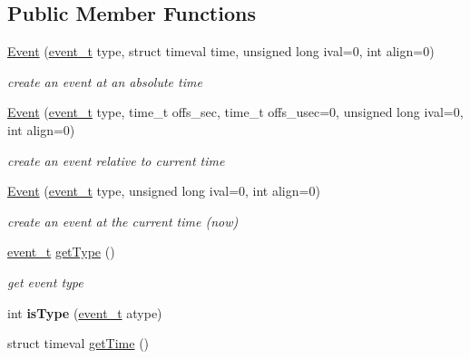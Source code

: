 \subsection*{Public Member Functions}
\begin{DoxyCompactItemize}
\item 
\hyperlink{classEvent_acd3f54caeb58e6375e51a044c0ee2616}{Event} (\hyperlink{Event_8h_a2fb9b58e4e5f14f40af8b4a1425841f8}{event\+\_\+t} type, struct timeval time, unsigned long ival=0, int align=0)
\begin{DoxyCompactList}\small\item\em create an event at an absolute time \end{DoxyCompactList}\item 
\hyperlink{classEvent_a0b28a5ecf2af747c56b9cdcd2e26642b}{Event} (\hyperlink{Event_8h_a2fb9b58e4e5f14f40af8b4a1425841f8}{event\+\_\+t} type, time\+\_\+t offs\+\_\+sec, time\+\_\+t offs\+\_\+usec=0, unsigned long ival=0, int align=0)
\begin{DoxyCompactList}\small\item\em create an event relative to current time \end{DoxyCompactList}\item 
\hyperlink{classEvent_a9fa90b8cff91b5d58a7fbd690e1bcfaa}{Event} (\hyperlink{Event_8h_a2fb9b58e4e5f14f40af8b4a1425841f8}{event\+\_\+t} type, unsigned long ival=0, int align=0)
\begin{DoxyCompactList}\small\item\em create an event at the current time (now) \end{DoxyCompactList}\item 
\mbox{\label{classEvent_a7682b6c4066b0733a61bae0a4c7110da}} 
\hyperlink{Event_8h_a2fb9b58e4e5f14f40af8b4a1425841f8}{event\+\_\+t} \hyperlink{classEvent_a7682b6c4066b0733a61bae0a4c7110da}{get\+Type} ()
\begin{DoxyCompactList}\small\item\em get event type \end{DoxyCompactList}\item 
\mbox{\label{classEvent_a197eb389db5c5e98fd6f4fa762f1f23e}} 
int {\bfseries is\+Type} (\hyperlink{Event_8h_a2fb9b58e4e5f14f40af8b4a1425841f8}{event\+\_\+t} atype)
\item 
\mbox{\label{classEvent_acee8c5f11e9706148029e7cc78db3f7f}} 
struct timeval \hyperlink{classEvent_acee8c5f11e9706148029e7cc78db3f7f}{get\+Time} ()

\end{DoxyCompactItemize}
